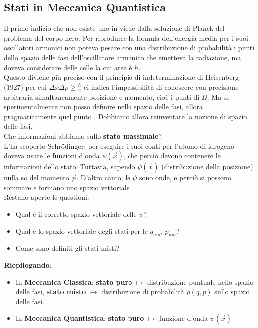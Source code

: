 \documentclass[FisicaTeorica.tex]{subfiles}
\begin{document}
\subsection{Stati in Meccanica Quantistica}
Il primo indizio che non esiste uno  in \MQ viene dalla soluzione di Planck del problema del corpo nero. Per riprodurre la formula dell'energia media per i suoi oscillatori armonici non poteva pesare con una distribuzione di probabilità i punti dello spazio delle fasi dell'oscillatore armonico che emetteva la radiazione, ma doveva considerare delle celle la cui area è $h$.\\ 
Questo diviene più preciso con il principio di indeterminazione di Heisenberg (1927) per cui 
$\Delta x \Delta p\geq \frac{\hbar}{2}$ ci indica l'impossibilità di conoscere con precisione arbitraria simultaneamente posizione e momento, cioè i punti di $\Omega$. Ma se sperimentalmente non posso definire  nello spazio delle fasi, allora pragmaticamente quel punto . Dobbiamo allora reinventare la nozione di spazio delle fasi.\\

Che informazioni abbiamo sullo \textbf{stato massimale}?\\
L'ha scoperto Schrödinger: per eseguire i suoi conti per l'atomo di idrogeno doveva usare le funzioni d'onda $\psi(\vec{x})$, che perciò devono contenere le informazioni dello stato.
Tuttavia, sapendo $\psi(\vec{x})$ (distribuzione della posizione) nulla so del momento $\vec{p}$. D'altro canto, le $\psi$ sono onde, e perciò si possono sommare e formano uno spazio vettoriale.\\
Restano aperte le questioni:
\begin{itemize}
    \item Qual è il corretto spazio vettoriale delle $\psi$?
    \item Qual è lo spazio vettoriale degli stati per le $q_{nm}$, $p_{nm}$?
    \item Come sono definiti gli stati misti? 
\end{itemize}

\textbf{Riepilogando}:
\begin{itemize}
    \item In \textbf{Meccanica Classica}: \textbf{stato puro} $\mapsto$ distribuzione  puntuale nello spazio delle fasi, \textbf{stato misto} $\mapsto$ distribuzione di probabilità $\rho(q,p)$ sullo spazio delle fasi.
    \item In \textbf{Meccanica Quantistica}: \textbf{stato puro} $\mapsto$ funzione d'onda $\psi(\vec{x})$
\end{itemize}
\end{document}
